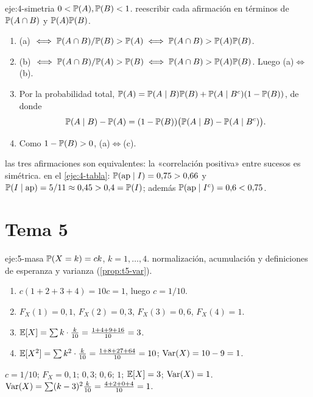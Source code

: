 \begin{solucion}{eje:4-simetria}
\datos $0<\mathbb{P}(A),\mathbb{P}(B)<1$.
\planteamiento reescribir cada afirmación en términos de $\mathbb{P}(A\cap B)$ y $\mathbb{P}(A)\mathbb{P}(B)$.
\pasos
\begin{enumerate}[label=\arabic*.]
  \item (a) $\iff\mathbb{P}(A\cap B)/\mathbb{P}(B)>\mathbb{P}(A)\iff\mathbb{P}(A\cap B)>\mathbb{P}(A)\mathbb{P}(B)$.
  \item (b) $\iff\mathbb{P}(A\cap B)/\mathbb{P}(A)>\mathbb{P}(B)\iff\mathbb{P}(A\cap B)>\mathbb{P}(A)\mathbb{P}(B)$. Luego (a)$\iff$(b).
  \item Por la probabilidad total, $\mathbb{P}(A)=\mathbb{P}(A\mid B)\mathbb{P}(B)+\mathbb{P}(A\mid B^{c})(1-\mathbb{P}(B))$, de donde
  \[
  \mathbb{P}(A\mid B)-\mathbb{P}(A)=(1-\mathbb{P}(B))\bigl(\mathbb{P}(A\mid B)-\mathbb{P}(A\mid B^{c})\bigr).
  \]
  \item Como $1-\mathbb{P}(B)>0$, (a)$\iff$(c).
\end{enumerate}
\resultado las tres afirmaciones son equivalentes: la «correlación positiva» entre sucesos es simétrica.
\comprobacion en el \cref{eje:4-tabla}: $\mathbb{P}(\text{ap}\mid I)=0{,}75>0{,}66$ y $\mathbb{P}(I\mid\text{ap})=5/11\approx0{,}45>0{,}4=\mathbb{P}(I)$; además $\mathbb{P}(\text{ap}\mid I^{c})=0{,}6<0{,}75$.
\end{solucion}

\section{Tema 5}

\begin{solucion}{eje:5-masa}
\datos $\mathbb{P}(X=k)=ck$, $k=1,\dots,4$.
\planteamiento normalización, acumulación y definiciones de esperanza y varianza (\cref{prop:t5-var}).
\pasos
\begin{enumerate}[label=\arabic*.]
  \item $c(1+2+3+4)=10c=1$, luego $c=1/10$.
  \item $F_X(1)=0{,}1$, $F_X(2)=0{,}3$, $F_X(3)=0{,}6$, $F_X(4)=1$.
  \item $\mathbb{E}[X]=\sum k\cdot\frac{k}{10}=\frac{1+4+9+16}{10}=3$.
  \item $\mathbb{E}[X^{2}]=\sum k^{2}\cdot\frac k{10}=\frac{1+8+27+64}{10}=10$; $\operatorname{Var}(X)=10-9=1$.
\end{enumerate}
\resultado $c=1/10$; $F_X=0{,}1;\,0{,}3;\,0{,}6;\,1$; $\mathbb{E}[X]=3$; $\operatorname{Var}(X)=1$.
\comprobacion $\operatorname{Var}(X)=\sum(k-3)^{2}\frac k{10}=\frac{4+2+0+4}{10}=1$.
\end{solucion}

